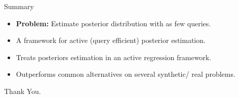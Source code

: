 

\begin{frame}{Summary}
\begin{itemize}
\item \textbf{Problem: } Estimate posterior distribution with as few queries.
\item A framework for active (query efficient) posterior estimation.
\item Treats posteriors estimation in an active regression framework.
\item Outperforms common alternatives on several synthetic/ real problems.
\end{itemize}
\pause
\vspace{0.9in}
\hspace{1.8in} Thank You.
\end{frame}
